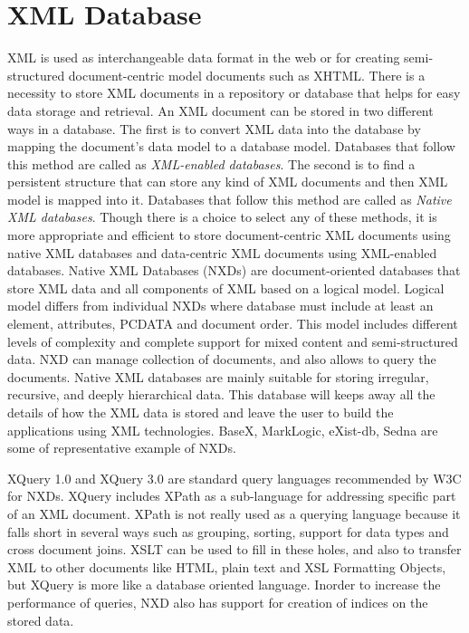 \section{XML Database}

  XML is used as interchangeable data format in the web or for creating semi-structured document-centric model documents such as XHTML. There is a necessity to store XML documents in a repository or database that helps for easy data storage and retrieval. An XML document can be stored in two different ways in a database. The first is to convert XML data into the database by mapping the document's data model to a database model. Databases that follow this method are called as \textit{XML-enabled databases}. The second is to find a persistent structure that can store any kind of XML documents and then XML model is mapped into it. Databases that follow this method are called as \textit{Native XML databases}\cite{pavlovic2007native}. Though there is a choice to select any of these methods, it is more appropriate and efficient to store document-centric XML documents using native XML databases and data-centric  XML documents using XML-enabled databases.	Native XML Databases (NXDs) are document-oriented databases that store XML data and all components of XML based on a logical model. Logical model differs from individual NXDs where database must include at least an element, attributes, PCDATA and document order. This model includes different levels of complexity and complete support for mixed content and semi-structured data. NXD can manage collection of documents, and also allows to query the documents. Native XML databases are mainly suitable for storing irregular, recursive, and deeply hierarchical data. This database will keeps away all the details of how the XML data is stored and leave the user to build the applications using XML technologies.  BaseX, MarkLogic, eXist-db, Sedna are some of representative example of  NXDs. 
  \par XQuery 1.0 and XQuery 3.0 are standard query languages recommended by W3C for NXDs. XQuery includes XPath as a sub-language for addressing specific part of an XML document. XPath is not really used as a querying language because it falls short in several ways such as grouping, sorting, support for data types and cross document joins. XSLT can be used to fill in these holes, and also to transfer XML to other documents like HTML, plain text and XSL Formatting Objects, but XQuery is more like a database oriented language.  Inorder to increase the performance of queries, NXD also has support for creation of indices on the stored data.\cite{pavlovic2007native}
